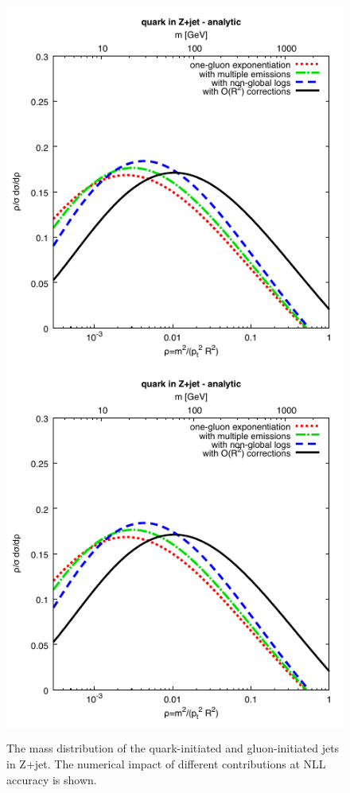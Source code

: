 \begin{figure}[tb]
  \begin{center}
\includegraphics[page=1,scale=0.85]{figures/plain-mass.pdf}
\includegraphics[page=2,scale=0.85]{figures/plain-mass.pdf}
    \caption{The mass distribution of the quark-initiated  and gluon-initiated jets in Z+jet. The numerical impact of different contributions at NLL accuracy is shown.}
    \label{fig:z+jet}
  \end{center}
\end{figure}


